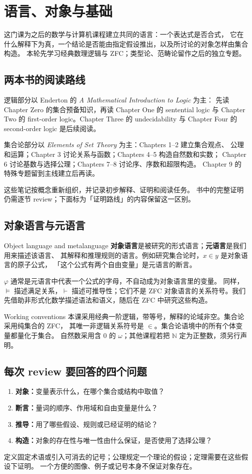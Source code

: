 \chapter{语言、对象与基础}

这门课为之后的数学与计算机课程建立共同的语言：一个表达式是否合式，
它在什么解释下为真，一个结论是否能由指定假设推出，以及所讨论的对象怎样由集合构造。
本轮先学习经典数理逻辑与 ZFC；类型论、范畴论留作之后的独立专题。

\section{两本书的阅读路线}
逻辑部分以 Enderton 的 \emph{A Mathematical Introduction to Logic} 为主：
先读 Chapter Zero 的集合预备知识，再读 Chapter One 的 sentential logic
与 Chapter Two 的 first-order logic。Chapter Three 的 undecidability
与 Chapter Four 的 second-order logic 是后续阅读。

集合论部分以 \emph{Elements of Set Theory} 为主：Chapters 1--2 建立集合观点、
公理和运算；Chapter 3 讨论关系与函数；Chapters 4--5 构造自然数和实数；
Chapter 6 讨论基数与选择公理；Chapters 7--8 讨论序、序数和超限构造。
Chapter 9 的特殊专题留到主线建立后再读。

这些笔记按概念重新组织，并记录初步解释、证明和阅读任务。
书中的完整证明仍需逐节 review；下面标为「证明路线」的内容保留这一区别。

\section{对象语言与元语言}
\begin{definition}{Object language and metalanguage}
\textbf{对象语言}是被研究的形式语言；\textbf{元语言}是我们用来描述该语言、
其解释和推理规则的语言。例如研究集合论时，\(x\in y\) 是对象语言的原子公式，
「这个公式有两个自由变量」是元语言的断言。
\end{definition}

\(\varphi\) 通常是元语言中代表一个公式的字母，不自动成为对象语言里的变量。
同样，\(\models\) 描述满足关系，\(\vdash\) 描述可推导性；它们不是 ZFC
对象语言的关系符号。我们先借助非形式化数学描述语法和语义，随后在 ZFC 中研究这些构造。

\begin{definition}{Working conventions}
本课采用经典一阶逻辑，带等号，解释的论域非空。集合论采用纯集合的 ZFC，
其唯一非逻辑关系符号是 \(\in\)。集合论语境中的所有个体变量都量化于集合。
自然数采用含 \(0\) 的 \(\omega\)；其他课程若把 \(\mathbb N\) 定为正整数，须另行声明。
\end{definition}

\section{每次 review 要回答的四个问题}
\begin{enumerate}
\item \textbf{对象：}变量表示什么，在哪个集合或结构中取值？
\item \textbf{断言：}量词的顺序、作用域和自由变量是什么？
\item \textbf{推导：}用了哪些假设、规则或已经证明的结论？
\item \textbf{构造：}对象的存在性与唯一性由什么保证，是否使用了选择公理？
\end{enumerate}
定义固定术语或引入可消去的记号；公理规定一个理论的假设；定理需要在这些假设下证明。
一个方便的图像、例子或记号本身不保证对象存在。
